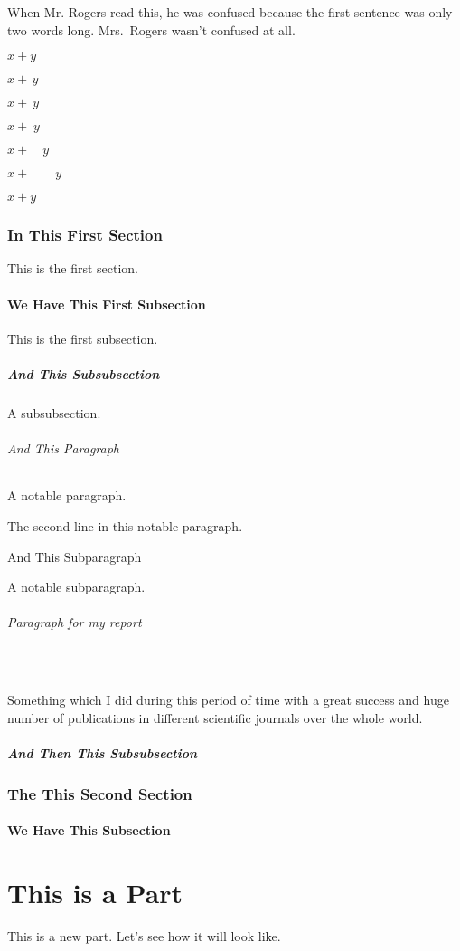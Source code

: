 \documentclass[11pt,a4paper,english]{article}
\begin{document}
When Mr. Rogers read this, he was confused because the first sentence
was only two words long. Mrs.\ Rogers wasn't confused at all.

$x+y$

$x+\,y$

$x+\:y$

$x+\;y$

$x+\quad y$

$x+\qquad y$

$x+\!y$

\section{In This First Section}

This is the first section.

\subsection{We Have This First Subsection}

This is the first subsection.

\subsubsection{And This Subsubsection}

A subsubsection.

%

\paragraph{And This Paragraph}

A notable paragraph.

The second line in this notable paragraph.

\subparagraph{And This Subparagraph}

A notable subparagraph.

\paragraph{Paragraph for my report}
\       %

Something which I did during this period of time with a great success and huge
number of publications in different scientific journals over the whole world. 

\subsubsection{And Then This Subsubsection}
\section{The This Second Section}
\subsection{We Have This Subsection}

\part{This is a Part}

This is a new part. Let's see how it will look like.
\end{document}
